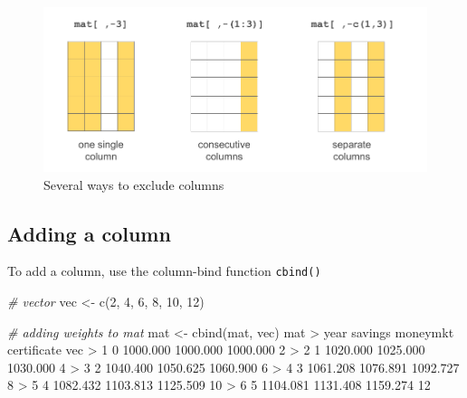 \documentclass[
]{book}
\newenvironment{Shaded}{\begin{snugshade}}{\end{snugshade}}
\newcommand{\CommentTok}[1]{\textcolor[rgb]{0.56,0.35,0.01}{\textit{#1}}}
\newcommand{\DecValTok}[1]{\textcolor[rgb]{0.00,0.00,0.81}{#1}}
\newcommand{\FloatTok}[1]{\textcolor[rgb]{0.00,0.00,0.81}{#1}}
\newcommand{\FunctionTok}[1]{\textcolor[rgb]{0.00,0.00,0.00}{#1}}
\newcommand{\NormalTok}[1]{#1}
\newcommand{\OtherTok}[1]{\textcolor[rgb]{0.56,0.35,0.01}{#1}}
\newcommand{\SpecialCharTok}[1]{\textcolor[rgb]{0.00,0.00,0.00}{#1}}
\begin{document}
\begin{figure}

{\centering \includegraphics[width=0.8\linewidth]{images/objects/obj-matrix-cols2} 

}

\caption{Several ways to exclude columns}\label{fig:unnamed-chunk-130}
\end{figure}

\hypertarget{adding-a-column}{%
\subsection{Adding a column}\label{adding-a-column}}

To add a column, use the column-bind function \texttt{cbind()}

\begin{Shaded}
\begin{Highlighting}[]
\CommentTok{\# vector}
\NormalTok{vec }\OtherTok{\textless{}{-}} \FunctionTok{c}\NormalTok{(}\DecValTok{2}\NormalTok{, }\DecValTok{4}\NormalTok{, }\DecValTok{6}\NormalTok{, }\DecValTok{8}\NormalTok{, }\DecValTok{10}\NormalTok{, }\DecValTok{12}\NormalTok{)}

\CommentTok{\# adding weights to mat}
\NormalTok{mat }\OtherTok{\textless{}{-}} \FunctionTok{cbind}\NormalTok{(mat, vec)}
\NormalTok{mat}
\SpecialCharTok{\textgreater{}}\NormalTok{   year  savings moneymkt certificate vec}
\SpecialCharTok{\textgreater{}} \DecValTok{1}    \DecValTok{0} \FloatTok{1000.000} \FloatTok{1000.000}    \FloatTok{1000.000}   \DecValTok{2}
\SpecialCharTok{\textgreater{}} \DecValTok{2}    \DecValTok{1} \FloatTok{1020.000} \FloatTok{1025.000}    \FloatTok{1030.000}   \DecValTok{4}
\SpecialCharTok{\textgreater{}} \DecValTok{3}    \DecValTok{2} \FloatTok{1040.400} \FloatTok{1050.625}    \FloatTok{1060.900}   \DecValTok{6}
\SpecialCharTok{\textgreater{}} \DecValTok{4}    \DecValTok{3} \FloatTok{1061.208} \FloatTok{1076.891}    \FloatTok{1092.727}   \DecValTok{8}
\SpecialCharTok{\textgreater{}} \DecValTok{5}    \DecValTok{4} \FloatTok{1082.432} \FloatTok{1103.813}    \FloatTok{1125.509}  \DecValTok{10}
\SpecialCharTok{\textgreater{}} \DecValTok{6}    \DecValTok{5} \FloatTok{1104.081} \FloatTok{1131.408}    \FloatTok{1159.274}  \DecValTok{12}
\end{Highlighting}
\end{Shaded}
\end{document}
